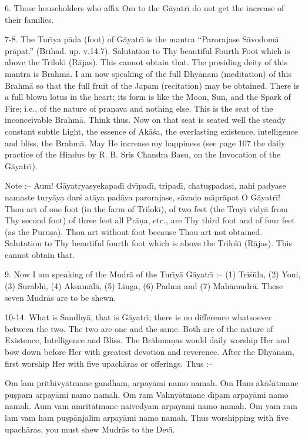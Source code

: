 6. Those householders who affix Om to the G\=ayatr\={\i} do not get the increase of their families.

7-8. The Tur\={\i}ya p\=ada (foot) of G\=ayatr\={\i} is the mantra ``Parorajase S\=avodom\=a pr\=apat.'' (Brihad. up. v.14.7). Salutation to Thy beautiful Fourth Foot which is above the Trilok\={\i} (R\=ajas). This cannot obtain that. The presiding deity of this mantra is Brahm\=a. I am now speaking of the full Dhy\=anam (meditation) of this Brahm\=a so that the full fruit of the Japam (recitation) may be obtained. There is a full blown lotus in the heart; its form is like the Moon, Sun, and the Spark of Fire; i.e., of the nature of pra\d{n}ava and nothing else. This is the seat of the inconceivable Brahm\=a. Think thus. Now on that seat is seated well the steady constant subtle Light, the essence of Ak\=a\'sa, the everlasting existence, intelligence and bliss, the Brahm\=a. May He increase my happiness (see page 107 the daily practice of the Hindus by R. B. Sris Chandra Basu, on the Invocation of the G\=ayatr\={\i}).

Note :-- Aum! G\=ayatryasyekapad\={\i} dv\={\i}pad\={\i}, tripad\={\i}, chatu\d{s}padasi, nahi padyase namaste tury\=aya dar\'s at\=aya pad\=aya parorajase, s\=avado m\=apr\=apat O G\=ayatr\={\i}! Thou art of one foot (in the farm of Trilok\={\i}), of two feet (the Tray\={\i} vidy\=a from Thy second foot) of three feet all Pr\=a\d{n}a, etc., are Thy third foot and of four feet (as the Puru\d{s}a). Thou art without foot because Thou art not obtained. Salutation to Thy beautiful fourth foot which is above the Trilok\={\i} (R\=ajas). This cannot obtain that.

9. Now I am speaking of the Mudr\=a of the Tur\={\i}y\=a G\=ayatr\={\i} :-- (1) Tri\'s\=ula, (2) Yoni, (3) Surabhi, (4) Ak\d{s}am\=al\=a, (5) Linga, (6) Padma and (7) Mah\=amudr\=a. These seven Mudr\=as are to be shewn.

10-14. What is Sandhy\=a, that is G\=ayatr\={\i}; there is no difference whatsoever between the two. The two are one and the same. Both are of the nature of Existence, Intelligence and Bliss. The Br\=ahma\d{n}as would daily worship Her and bow down before Her with greatest devotion and reverence. After the Dhy\=anam, first worship Her with five upach\=aras or offerings. Thus :--

Om lam prithivy\=atmane gandham, arpay\=ami namo namah. Om Ham \=ak\=a\'s\=atmane pu\d{s}pam arpay\=ami namo namah. Om ram Vahny\=atmane d\={\i}pam arpay\=ami namo namah. Aum vam amrit\=atmane naivedyam arpay\=ami namo namah. Om yam ram lam vam ham pu\d{s}p\=anjalim arpay\=ami namo namah. Thus worshipping with five upach\=aras, you must shew Mudr\=as to the Dev\={\i}.

